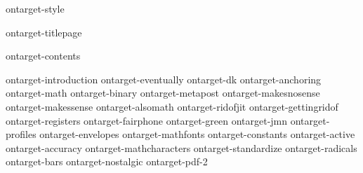 
\environment ontarget-style

\dontcomplain

\startdocument

    \component ontarget-titlepage

    \startfrontmatter
        \component ontarget-contents
    \stopfrontmatter

    \startbodymatter
        \component ontarget-introduction
        \component ontarget-eventually
        \component ontarget-dk
        \component ontarget-anchoring
        \component ontarget-math
        \component ontarget-binary
        \component ontarget-metapost
        \component ontarget-makesnosense
        \component ontarget-makessense
        \component ontarget-alsomath
        \component ontarget-ridofjit
        \component ontarget-gettingridof
        \component ontarget-registers
        \component ontarget-fairphone
        \component ontarget-green
        \component ontarget-jmn
        \component ontarget-profiles
        \component ontarget-envelopes
        \component ontarget-mathfonts
        \component ontarget-constants
        \component ontarget-active
        \component ontarget-accuracy
        \component ontarget-mathcharacters
        \component ontarget-standardize
        \component ontarget-radicals
        \component ontarget-bars
        \component ontarget-nostalgic
        \component ontarget-pdf-2
    \stopbodymatter

\stopdocument

